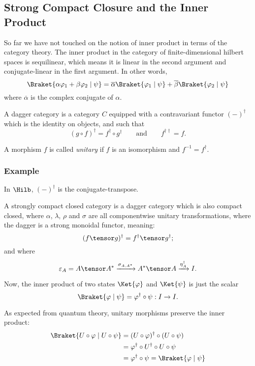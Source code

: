 \subsection{Strong Compact Closure and the Inner Product}

So far we have not touched on the notion of inner product in terms of the category theory.
The inner product in the category of finite-dimensional hilbert spaces is sequilinear,
which means it is linear in the second argument and conjugate-linear in the first argument.
In other words,
\[ \Braket{\alpha \varphi_1 + \beta \varphi_2 \mid \psi} 
   = \overline{\alpha} \Braket{\varphi_1 \mid \psi} + \overline{\beta} \Braket{\varphi_2 \mid \psi}
\]
where $\overline{\alpha}$ is the complex conjugate of $\alpha$.


\begin{definition}
    A dagger category is a category $C$ equipped with a contravariant functor $(-)^\dagger$ 
    which is the identity on objects, and such that 
    \[ (g \circ f)^\dagger = f^\dagger \circ g^\dagger \qquad\text{and}\qquad f^{\dagger\dagger} = f. \]
\end{definition}

A morphism $f$ is called \emph{unitary} if $f$ is an isomorphism and $f^{-1}=f^\dagger$.

\subsubsection*{Example} In $\Hilb$, $(-)^\dagger$ is the conjugate-transpose.

\begin{definition}
    A strongly compact closed category is a dagger category which is also compact closed,
    where $\alpha$, $\lambda$, $\rho$ and $\sigma$ are all componentwise unitary transformations,
    where the dagger is a strong monoidal functor, meaning:
    \[ (f \tensor g)^\dagger = f^\dagger \tensor g^\dagger; \]
    and where
    \[ \varepsilon_A = A \tensor A^*
        \xrightarrow{\sigma_{A,A^*}} A^* \tensor A
        \xrightarrow{\eta_A^\dagger} I.
    \]
\end{definition}


Now, the inner product of two states $\Ket{\varphi}$ and $\Ket{\psi}$
is just the scalar
\[ \Braket{\varphi \mid \psi} = \varphi^\dagger \circ \psi : I \rightarrow I. \]

As expected from quantum theory, unitary morphisms preserve the inner product:
\begin{align*}
    \Braket{U\circ \varphi \mid U \circ \psi}
    &= (U \circ \varphi)^\dagger \circ (U \circ \psi) \\
    &= \varphi^\dagger \circ U^\dagger \circ U \circ \psi \\
    &= \varphi^\dagger \circ \psi = \Braket{\varphi \mid \psi}
\end{align*}

